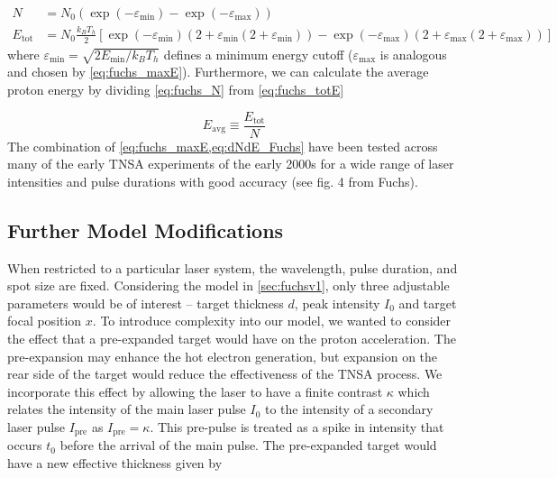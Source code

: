 \begin{align}
	N &= N_0 (\exp(-\varepsilon_\text{min}) - \exp(-\varepsilon_\text{max})) \label{eq:fuchs_N} \\
	E_\text{tot} &= N_0 \frac{k_B T_h}{2}[\exp(-\varepsilon_\text{min})(2 + \varepsilon_\text{min}(2 + \varepsilon_\text{min})) - \exp(-\varepsilon_\text{max})(2 + \varepsilon_\text{max}(2 + \varepsilon_\text{max}))] \label{eq:fuchs_totE}
\end{align}
where $\varepsilon_\text{min} = \sqrt{2 E_\text{min} / k_B T_h}$ defines a minimum energy cutoff ($\varepsilon_\text{max}$ is analogous and chosen by \cref{eq:fuchs_maxE}). Furthermore, we can calculate the average proton energy by dividing \cref{eq:fuchs_N} from \cref{eq:fuchs_totE}

\begin{equation}
	E_\text{avg} \equiv \frac{E_\text{tot}}{N}
\end{equation}
The combination of \cref{eq:fuchs_maxE,eq:dNdE_Fuchs} have been tested across many of the early TNSA experiments of the early 2000s for a wide range of laser intensities and pulse durations with good accuracy (see fig. 4 from Fuchs\cite{Fuchs_2005_Nat}).

\subsection{Further Model Modifications} \label{sec:fuchsv2}
When restricted to a particular laser system, the wavelength, pulse duration, and spot size are fixed. Considering the model in \cref{sec:fuchsv1}, only three adjustable parameters would be of interest -- target thickness $d$, peak intensity $I_0$ and target focal position $x$. To introduce complexity into our model, we wanted to consider the effect that a pre-expanded target would have on the proton acceleration. The pre-expansion may enhance the hot electron generation, but expansion on the rear side of the target would reduce the effectiveness of the TNSA process. We incorporate this effect by allowing the laser to have a finite contrast $\kappa$ which relates the intensity of the main laser pulse $I_0$ to the intensity of a secondary laser pulse $I_\text{pre}$ as $I_\text{pre} = \kappa$. This pre-pulse is treated as a spike in intensity that occurs $t_0$ before the arrival of the main pulse. The pre-expanded target would have a new effective thickness given by 

